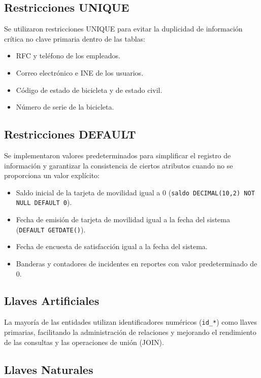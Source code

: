 \subsection{Restricciones UNIQUE}

Se utilizaron restricciones UNIQUE para evitar la duplicidad de información crítica no clave primaria dentro de las tablas:
\begin{itemize}
	\item RFC y teléfono de los empleados.
	\item Correo electrónico e INE de los usuarios.
	\item Código de estado de bicicleta y de estado civil.
	\item Número de serie de la bicicleta.
\end{itemize}

\subsection{Restricciones DEFAULT}

Se implementaron valores predeterminados para simplificar el registro de información y garantizar la consistencia de ciertos atributos cuando no se proporciona un valor explícito:
\begin{itemize}
	\item Saldo inicial de la tarjeta de movilidad igual a 0 (\texttt{saldo DECIMAL(10,2) NOT NULL DEFAULT 0}).
	\item Fecha de emisión de tarjeta de movilidad igual a la fecha del sistema (\texttt{DEFAULT GETDATE()}).
	\item Fecha de encuesta de satisfacción igual a la fecha del sistema.
	\item Banderas y contadores de incidentes en reportes con valor predeterminado de 0.
\end{itemize}

\subsection{Llaves Artificiales}

La mayoría de las entidades utilizan identificadores numéricos (\texttt{id\_*}) como llaves primarias, facilitando la administración de relaciones y mejorando el rendimiento de las consultas y las operaciones de unión (JOIN).

\subsection{Llaves Naturales}

